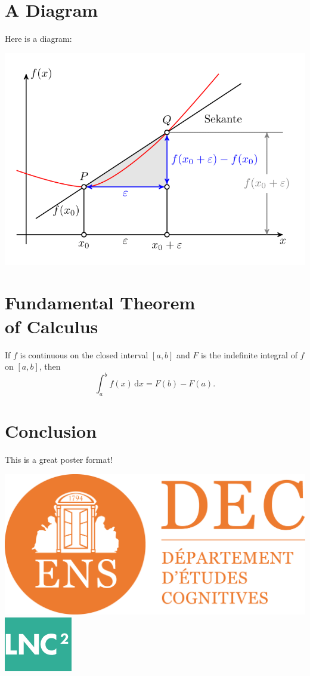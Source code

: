 \documentclass[a0paper,fleqn]{better_poster/betterposter}
\begin{document}
{\section{A Diagram}
Here is a diagram:
\begin{center}
\includegraphics[width=\textwidth]{img/tikzexample1}
\end{center}

\section{Fundamental Theorem\\of Calculus}
If $f$ is continuous on the closed interval $[a,b]$ and $F$ is the indefinite integral of $f$ on $[a,b]$, then
\begin{equation}
\int_a^b f(x)\,\mathrm{d}x = F(b)-F(a).
\end{equation}

\section{Conclusion}
This is a great poster format!

\vfill

\includegraphics[width=0.5 \textwidth]{logos/logoDEC.png} \hfill
\includegraphics[width=0.3 \textwidth]{logos/logoLNC2.png} %
\\

}
\end{document}
